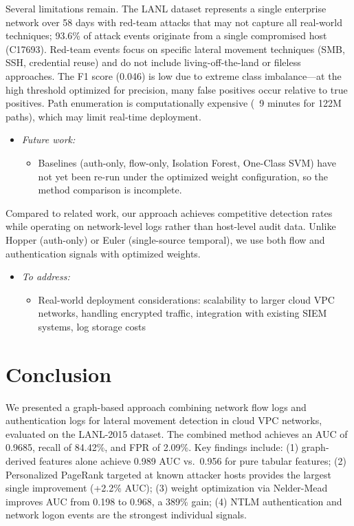 \documentclass[letterpaper,twocolumn,10pt]{article}
\begin{document}
Several limitations remain. The LANL dataset represents a single enterprise network over 58 days with red-team attacks that may not capture all real-world techniques; 93.6\% of attack events originate from a single compromised host (C17693). Red-team events focus on specific lateral movement techniques (SMB, SSH, credential reuse) and do not include living-off-the-land or fileless approaches. The F1 score (0.046) is low due to extreme class imbalance---at the high threshold optimized for precision, many false positives occur relative to true positives. Path enumeration is computationally expensive (~9 minutes for 122M paths), which may limit real-time deployment.

\begin{itemize}
\item \textit{Future work:}
\begin{itemize}
\item Baselines (auth-only, flow-only, Isolation Forest, One-Class SVM) have not yet been re-run under the optimized weight configuration, so the method comparison is incomplete.
\end{itemize}
\end{itemize}

Compared to related work, our approach achieves competitive detection rates while operating on network-level logs rather than host-level audit data. Unlike Hopper (auth-only) or Euler (single-source temporal), we use both flow and authentication signals with optimized weights.

\begin{itemize}
\item \textit{To address:}
\begin{itemize}
\item Real-world deployment considerations: scalability to larger cloud VPC networks, handling encrypted traffic, integration with existing SIEM systems, log storage costs
\end{itemize}
\end{itemize}

\section{Conclusion}

We presented a graph-based approach combining network flow logs and authentication logs for lateral movement detection in cloud VPC networks, evaluated on the LANL-2015 dataset. The combined method achieves an AUC of 0.9685, recall of 84.42\%, and FPR of 2.09\%. Key findings include: (1) graph-derived features alone achieve 0.989 AUC vs.\ 0.956 for pure tabular features; (2) Personalized PageRank targeted at known attacker hosts provides the largest single improvement (+2.2\% AUC); (3) weight optimization via Nelder-Mead improves AUC from 0.198 to 0.968, a 389\% gain; (4) NTLM authentication and network logon events are the strongest individual signals.
\end{document}
